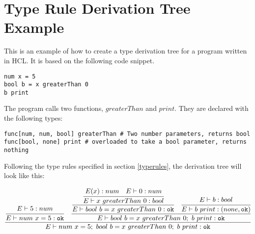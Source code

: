 \section{Type Rule Derivation Tree Example}
\label{sec:typeRuleTree}
This is an example of how to create a type derivation tree for a program written in HCL. It is based on the following code snippet.

\begin{lstlisting}[language=HCL,label=lis:typeTreeCode]
num x = 5
bool b = x greaterThan 0
b print
\end{lstlisting}

The program calls two functions, $greaterThan$ and $print$.
They are declared with the following types:

\begin{lstlisting}[language=HCL,label=lis:typeTreeCode]
func[num, num, bool] greaterThan # Two number parameters, returns bool
func[bool, none] print # overloaded to take a bool parameter, returns nothing
\end{lstlisting}

Following the type rules specified in section \ref{typerules}, the derivation tree will look like this:
\begin{center}
	\begin{math}
		\cfrac
		{\cfrac
			{E\vdash 5 : num}
			{E\vdash num\ x = 5 : \texttt{ok}}\quad \cfrac
				{\cfrac
					{\cfrac
						{E(x) : num\quad E \vdash 0 : num}
						{E\vdash x\ greaterThan\ 0: bool}}
					{E\vdash bool\ b = x\ greaterThan\ 0 : \texttt{ok}}\quad \cfrac
					{E\vdash b : bool}
					{E\vdash b\ print : (none, \texttt{ok})}}
				{E\vdash bool\ b = x\ greaterThan\ 0;\ b\ print : \texttt{ok}}}
		{E \vdash num\ x = 5;\ bool\ b = x\ greaterThan\ 0;\ b\ print : \texttt{ok}}
	\end{math}
\end{center}